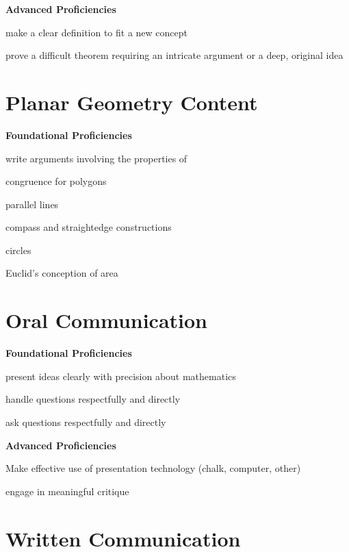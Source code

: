 \documentclass[11pt]{amsart}
\begin{document}
\textbf{Advanced Proficiencies}
\begin{compactitem}
\item make a clear definition to fit a new concept
\item prove a difficult theorem requiring an intricate argument or a deep, original idea
\end{compactitem}

\section*{Planar Geometry Content}

\textbf{Foundational Proficiencies}
\begin{compactitem}
\item write arguments involving the properties of
\begin{compactitem}
    \item congruence for polygons
    \item parallel lines
    \item compass and straightedge constructions
    \item circles
    \item Euclid's conception of area
\end{compactitem}
\end{compactitem}

\section*{Oral Communication}

\textbf{Foundational Proficiencies}
\begin{compactitem}
\item present ideas clearly with precision about mathematics
\item handle questions respectfully and directly
\item ask questions respectfully and directly
\end{compactitem}

\textbf{Advanced Proficiencies}
\begin{compactitem}
\item Make effective use of presentation technology (chalk, computer, other)
\item engage in meaningful critique
\end{compactitem}

\section*{Written Communication}
\end{document}
